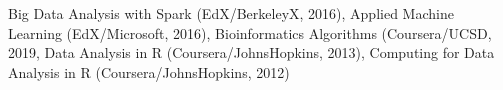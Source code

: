 Big Data Analysis with Spark (EdX/BerkeleyX, 2016),
Applied Machine Learning (EdX/Microsoft, 2016),
Bioinformatics Algorithms (Coursera/UCSD, 2019,
Data Analysis in R (Coursera/JohnsHopkins, 2013),
Computing for Data Analysis in R (Coursera/JohnsHopkins, 2012)
